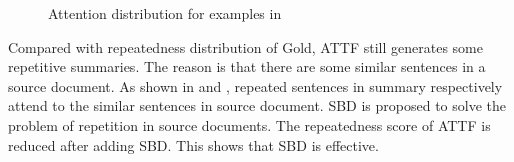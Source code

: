 \begin{figure}[th!]
\centering
{}
\quad
{}
\quad
{}
\quad
{}
\caption{Attention distribution for examples in }
\label{fig:attn_maps}
\end{figure}

Compared with repeatedness distribution of Gold,
ATTF still generates some repetitive summaries.
The reason is that there are some similar sentences in a source document.
As shown in  and , repeated sentences
in summary respectively attend to the similar sentences in source document.
SBD is proposed to solve the problem of repetition in source documents.
The repeatedness score of ATTF is reduced after adding SBD.
This shows that SBD is effective.

